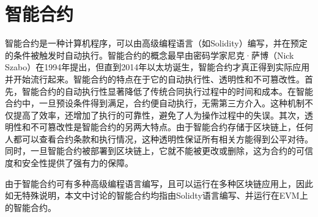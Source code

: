 \section{智能合约}
\label{sec:智能合约}
智能合约是一种计算机程序，可以由高级编程语言（如Solidity）编写，并在预定的条件被触发时自动执行。智能合约的概念最早由密码学家尼克·萨博（Nick Szabo）在1994年提出，但直到2014年以太坊诞生，智能合约才真正得到实际应用并开始流行起来。智能合约的特点在于它的自动执行性、透明性和不可篡改性。首先，智能合约的自动执行性显著降低了传统合同执行过程中的时间和成本。在智能合约中，一旦预设条件得到满足，合约便自动执行，无需第三方介入。这种机制不仅提高了效率，还增加了执行的可靠性，避免了人为操作过程中的失误。其次，透明性和不可篡改性是智能合约的另两大特点。由于智能合约存储于区块链上，任何人都可以查看合约条款和执行情况，这种透明性保证所有相关方能得到公平对待。同时，一旦智能合约被部署到区块链上，它就不能被更改或删除，这为合约的可信度和安全性提供了强有力的保障。

由于智能合约可有多种高级编程语言编写，且可以运行在多种区块链应用上，因此如无特殊说明，本文中讨论的智能合约均指由Solidty语言编写、并运行在EVM上的智能合约。
